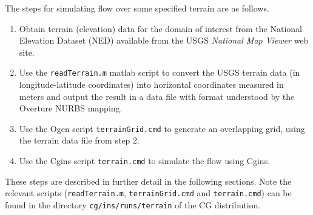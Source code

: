 \documentclass[11pt]{article}
\begin{document}
The steps for simulating flow over some specified terrain are as follows. 
\begin{enumerate}
  \item Obtain terrain (elevation) data for the domain of interest 
     from the National Elevation Dataset (NED) available from the USGS {\em National Map Viewer} web site.
  \item Use the {\tt readTerrain.m} matlab script to convert the USGS terrain data (in longitude-latitude coordinates)
       into horizontal coordinates measured in meters and output the result in a data file with format understood by
       the Overture NURBS mapping. 
  \item Use the Ogen script {\tt terrainGrid.cmd} to generate an overlapping grid, using the terrain data file from step 2.
  \item Use the Cgins script {\tt terrain.cmd} to simulate the flow using Cgins.
\end{enumerate}
These steps are described in further detail 
in the following sections. Note the relevant scripts ({\tt readTerrain.m}, {\tt terrainGrid.cmd}
and {\tt terrain.cmd}) can be found in 
the directory {\tt cg/ins/runs/terrain} of the CG distribution. 




\end{document}
